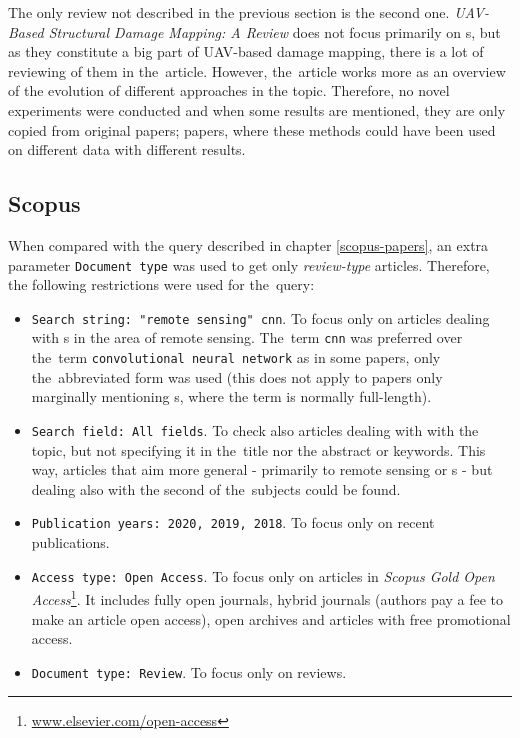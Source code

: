 The only review not described in the previous section is the second one. \textit{UAV-Based Structural Damage Mapping: A Review} does not focus primarily on s, but as they constitute a big part of UAV-based damage mapping, there is a lot of reviewing of them in the~article. However, the~article works more as an overview of the evolution of different approaches in the topic. Therefore, no novel experiments were conducted and when some results are mentioned, they are only copied from original papers; papers, where these methods could have been used on different data with different results.

\subsection{Scopus}
\label{scopus-reviews}

When compared with the query described in chapter \ref{scopus-papers}, an extra parameter \verb|Document type| was used to get only \textit{review-type} articles. Therefore, the following restrictions were used for the~query:

\begin{itemize}
	\item \verb|Search string: "remote sensing" cnn|. To focus only on articles dealing with s in the area of remote sensing. The~term \verb|cnn| was preferred over the~term \verb|convolutional neural network| as in some papers, only the~abbreviated form was used (this does not apply to papers only marginally mentioning s, where the term is normally full-length).
	\item \verb|Search field: All fields|. To check also articles dealing with with the topic, but not specifying it in the~title nor the abstract or keywords. This way, articles that aim more general - primarily to remote sensing or s - but dealing also with the second of the~subjects could be found.
	\item \verb|Publication years: 2020, 2019, 2018|. To focus only on recent publications.
	\item \verb|Access type: Open Access|. To focus only on articles in \textit{Scopus Gold Open Access}\footnote{\url{www.elsevier.com/open-access}}. It includes fully open journals, hybrid journals (authors pay a fee to make an article open access), open archives and articles with free promotional access.
	\item \verb|Document type: Review|. To focus only on reviews.
\end{itemize}

